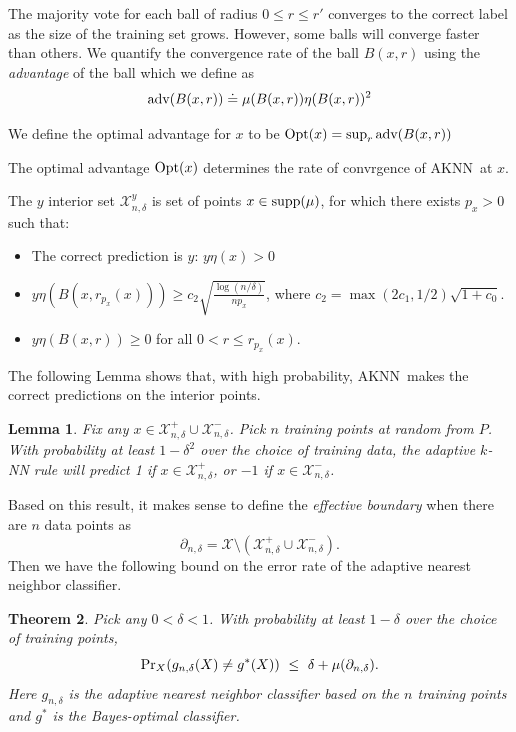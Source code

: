 \documentclass{article}
\def\pr{{\rm Pr}}
\def\X{{\mathcal X}}
\def\supp{{\rm supp}}
\newcommand{\algname}{\textsc{AKNN}}
\newtheorem{theorem}{Theorem}
\newtheorem{lemma}[theorem]{Lemma}
\newcommand{\comment}[3]{}  %
\newcommand{\shay}[1]{\comment{purple}{Shay}{#1}}
\newcommand{\yoavv}[1]{\comment{green}{Yoav}{#1}}
\begin{document}
The majority vote for each ball of radius $0 \leq r \leq r'$ converges
to the correct label as the size of the training set grows. However,
some balls will converge faster than others.
We quantify the convergence rate of the ball $B(x,r)$ using the
{\em advantage} of the ball which we define as
\begin{equation}
\mbox{adv}(B(x,r)) \doteq \mu(B(x,r)) \eta(B(x,r))^2
\end{equation}

We define the optimal advantage for $x$ to be $\mbox{Opt}(x)= \sup_r \mbox{adv}(B(x,r))$

\iffalse
The optimal advantage $\mbox{Opt}(x)$ determines the rate of convrgence of
\algname\ at $x$. 

The $y$ interior set $\X^y_{n,\delta}$ is set of points $x \in \supp(\mu)$, for which 
there exists $p_x > 0$ such that:
\begin{itemize}
\item The correct prediction is $y$: $y \eta(x) > 0$
\item $y \eta(B(x,r_{p_x}(x))) \geq c_2 \sqrt{\frac{\log (n/\delta)}{np_x}}$, where $c_2 = \max(2c_1, 1/2) \sqrt{1+c_0}$. 
\item $y \eta(B(x,r)) \geq 0 $ for all $0 < r \leq r_{p_x}(x)$. 
\end{itemize}

The following Lemma shows that, with high probability, \algname\ makes
the correct predictions on the interior points.
\begin{lemma}
Fix any $x \in \X^+_{n,\delta} \cup \X^-_{n,\delta}$. Pick $n$
training points at random from $P$. With probability at least
$1-\delta^2$ over the choice of training data, the adaptive $k$-NN
rule will predict 1 if $x \in \X^+_{n,\delta}$, or $-1$ if $x \in
\X^-_{n,\delta}$.
\label{lemma:good-sets}
\end{lemma}

Based on this result, it makes sense to define the {\it effective boundary} when there are $n$ data points as 
$$ \partial_{n,\delta} = \X \setminus (\X^+_{n,\delta} \cup \X^-_{n,\delta}) .$$
Then we have the following bound on the error rate of the adaptive nearest neighbor classifier.
\begin{theorem}
Pick any $0 < \delta < 1$. With probability at least $1-\delta$ over the choice of training points,
$$ \pr_{X}(g_{n,\delta}(X) \neq g^*(X)) \ \leq \ \delta + \mu(\partial_{n,\delta}) .$$
Here $g_{n,\delta}$ is the adaptive nearest neighbor classifier based on the $n$ training points and $g^*$ is the Bayes-optimal classifier. \shay{The quantification over $\delta$ confuses me; note that the adaptive nearest neighbor classifier $g_{n,\delta}$ gets $\delta$ as an input (because the threshold $\Delta(n,k)$ does).} 
\label{thm:general-error-bound}
\end{theorem}
\end{document}
